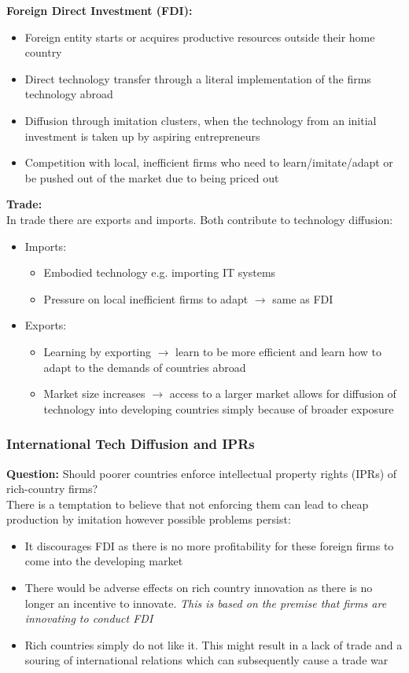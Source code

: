\documentclass[12pt, letterpaper]{article}
\begin{document}
\textbf{Foreign Direct Investment (FDI):}
\begin{itemize}
	\item Foreign entity starts or acquires productive resources outside their home country
	\item Direct technology transfer through a literal implementation of the firms technology abroad
	\item Diffusion through imitation clusters, when the technology from an initial investment is taken up by aspiring entrepreneurs
	\item Competition with local, inefficient firms who need to learn/imitate/adapt or be pushed out of the market due to being priced out
\end{itemize}

\textbf{Trade:}\\
In trade there are exports and imports. Both contribute to technology diffusion:
\begin{itemize}
	\item Imports:
		\begin{itemize}
			\item Embodied technology e.g. importing IT systems
			\item Pressure on local inefficient firms to adapt $\rightarrow$ same as FDI
		\end{itemize}
	\item Exports:
		\begin{itemize}
			\item Learning by exporting $\rightarrow$ learn to be more efficient and learn how to adapt to the demands of countries abroad
			\item Market size increases $\rightarrow$ access to a larger market allows for diffusion of technology into developing countries simply because of broader exposure
		\end{itemize}
\end{itemize}

\subsubsection{International Tech Diffusion and IPRs}
\textbf{Question:} Should poorer countries enforce intellectual property rights (IPRs) of rich-country firms?\\
There is a temptation to believe that not enforcing them can lead to cheap production by imitation however possible problems persist:
\begin{itemize}
	\item It discourages FDI as there is no more profitability for these foreign firms to come into the developing market
	\item There would be adverse effects on rich country innovation as there is no longer an incentive to innovate. \textit{This is based on the premise that firms are innovating to conduct FDI}
	\item Rich countries simply do not like it. This might result in a lack of trade and a souring of international relations which can subsequently cause a trade war
\end{itemize}
\end{document}
